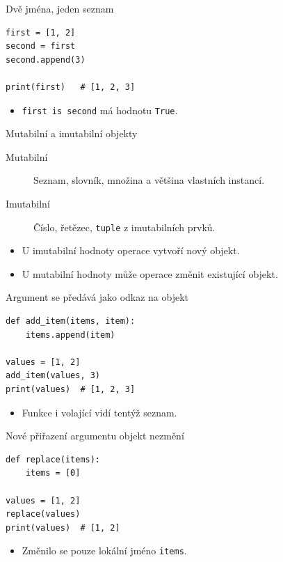 \documentclass[aspectratio=169]{beamer}
\begin{document}
\begin{frame}[fragile]{Dvě jména, jeden seznam}
\begin{lstlisting}[style=python]
first = [1, 2]
second = first
second.append(3)

print(first)   # [1, 2, 3]
\end{lstlisting}
\begin{itemize}\item \texttt{first is second} má hodnotu \texttt{True}.\end{itemize}
\end{frame}

\begin{frame}{Mutabilní a imutabilní objekty}
\begin{description}
\item[Mutabilní] Seznam, slovník, množina a většina vlastních instancí.
\item[Imutabilní] Číslo, řetězec, \texttt{tuple} z imutabilních prvků.
\end{description}
\begin{itemize}
\item U imutabilní hodnoty operace vytvoří nový objekt.
\item U mutabilní hodnoty může operace změnit existující objekt.
\end{itemize}
\end{frame}

\begin{frame}[fragile]{Argument se předává jako odkaz na objekt}
\begin{lstlisting}[style=python]
def add_item(items, item):
    items.append(item)

values = [1, 2]
add_item(values, 3)
print(values)  # [1, 2, 3]
\end{lstlisting}
\begin{itemize}\item Funkce i volající vidí tentýž seznam.\end{itemize}
\end{frame}

\begin{frame}[fragile]{Nové přiřazení argumentu objekt nezmění}
\begin{lstlisting}[style=python]
def replace(items):
    items = [0]

values = [1, 2]
replace(values)
print(values)  # [1, 2]
\end{lstlisting}
\begin{itemize}\item Změnilo se pouze lokální jméno \texttt{items}.\end{itemize}
\end{frame}
\end{document}
